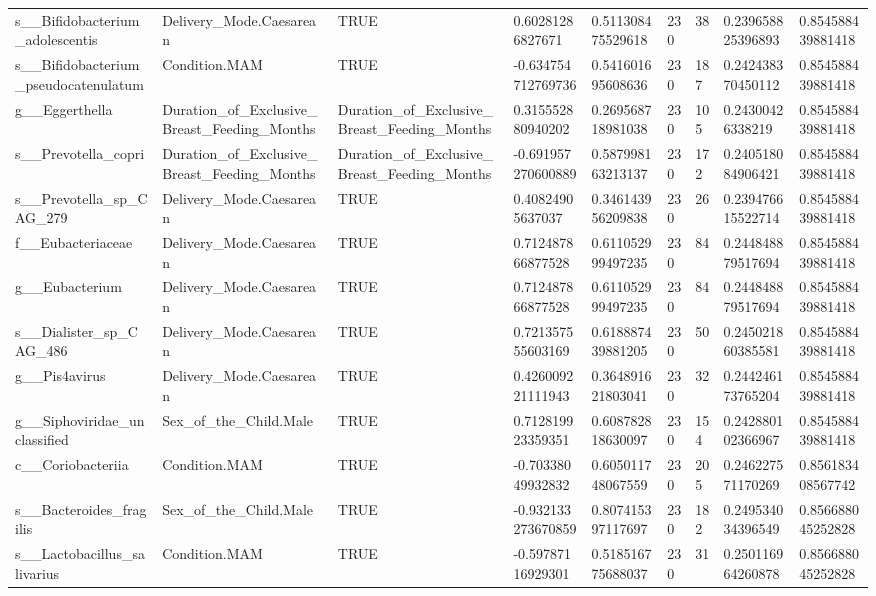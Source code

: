 \begin{longtable}{lllllllll}
s\_\_Bifidobacterium\_adolescentis & Delivery\_Mode.Caesarean & TRUE & 0.60281286827671 & 0.511308475529618 & 230 & 38 & 0.239658825396893 & 0.854588439881418 \\
s\_\_Bifidobacterium\_pseudocatenulatum & Condition.MAM & TRUE & -0.634754712769736 & 0.541601695608636 & 230 & 187 & 0.242438370450112 & 0.854588439881418 \\
g\_\_Eggerthella & Duration\_of\_Exclusive\_Breast\_Feeding\_Months & Duration\_of\_Exclusive\_Breast\_Feeding\_Months & 0.315552880940202 & 0.269568718981038 & 230 & 105 & 0.24300426338219 & 0.854588439881418 \\
s\_\_Prevotella\_copri & Duration\_of\_Exclusive\_Breast\_Feeding\_Months & Duration\_of\_Exclusive\_Breast\_Feeding\_Months & -0.691957270600889 & 0.587998163213137 & 230 & 172 & 0.240518084906421 & 0.854588439881418 \\
s\_\_Prevotella\_sp\_CAG\_279 & Delivery\_Mode.Caesarean & TRUE & 0.40824905637037 & 0.346143956209838 & 230 & 26 & 0.239476615522714 & 0.854588439881418 \\
f\_\_Eubacteriaceae & Delivery\_Mode.Caesarean & TRUE & 0.712487866877528 & 0.611052999497235 & 230 & 84 & 0.244848879517694 & 0.854588439881418 \\
g\_\_Eubacterium & Delivery\_Mode.Caesarean & TRUE & 0.712487866877528 & 0.611052999497235 & 230 & 84 & 0.244848879517694 & 0.854588439881418 \\
s\_\_Dialister\_sp\_CAG\_486 & Delivery\_Mode.Caesarean & TRUE & 0.721357555603169 & 0.618887439881205 & 230 & 50 & 0.245021860385581 & 0.854588439881418 \\
g\_\_Pis4avirus & Delivery\_Mode.Caesarean & TRUE & 0.426009221111943 & 0.364891621803041 & 230 & 32 & 0.244246173765204 & 0.854588439881418 \\
g\_\_Siphoviridae\_unclassified & Sex\_of\_the\_Child.Male & TRUE & 0.712819923359351 & 0.608782818630097 & 230 & 154 & 0.242880102366967 & 0.854588439881418 \\
c\_\_Coriobacteriia & Condition.MAM & TRUE & -0.70338049932832 & 0.605011748067559 & 230 & 205 & 0.246227571170269 & 0.856183408567742 \\
s\_\_Bacteroides\_fragilis & Sex\_of\_the\_Child.Male & TRUE & -0.932133273670859 & 0.807415397117697 & 230 & 182 & 0.249534034396549 & 0.856688045252828 \\
s\_\_Lactobacillus\_salivarius & Condition.MAM & TRUE & -0.59787116929301 & 0.518516775688037 & 230 & 31 & 0.250116964260878 & 0.856688045252828 \\

\end{longtable}
